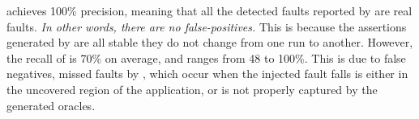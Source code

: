 \tool achieves 100\% precision, meaning that all the detected faults reported by \tool are real faults. {\em In other words, there are no false-positives.}
This is because the assertions generated by \tool are all stable \ie they do not change from one run to another. %
However, the recall of \tool is 70\% on average, and ranges from 48 to 100\%. This is due to false negatives, \ie missed faults by \tool, 
which occur when the injected fault falls is either in the uncovered region of the application, or is not properly captured by the generated oracles.  


